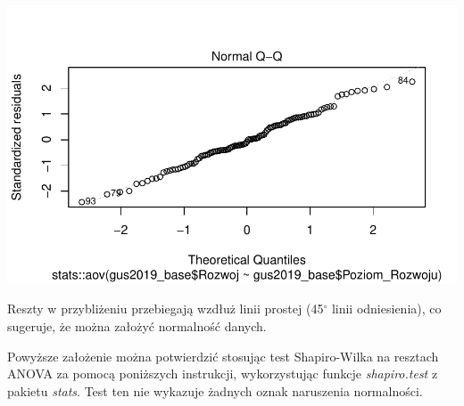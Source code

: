 \documentclass{amuthesis}
\begin{document}
\begin{Shaded}
\begin{Highlighting}[]
\NormalTok{)}
\end{Highlighting}
\end{Shaded}

\begin{center}\includegraphics[width=1\linewidth]{figures/unnamed-chunk-39-1} \end{center}

Reszty w przybliżeniu przebiegają wzdłuż linii prostej (45\(^\circ\) linii odniesienia), co sugeruje, że można założyć normalność danych.

Powyższe założenie można potwierdzić stosując test Shapiro-Wilka na resztach ANOVA za pomocą poniższych instrukcji, wykorzystując funkcje \emph{shapiro.test} z pakietu \emph{stats}. Test ten nie wykazuje żadnych oznak naruszenia normalności.

\begin{Shaded}
\begin{Highlighting}[]
\OtherTok{\textless{}{-}} \NormalTok{(}
\SpecialCharTok{::}\NormalTok{(}
\CommentTok{\#\textgreater{} }
\CommentTok{\#\textgreater{} }
\end{Highlighting}
\end{Shaded}
\end{document}

